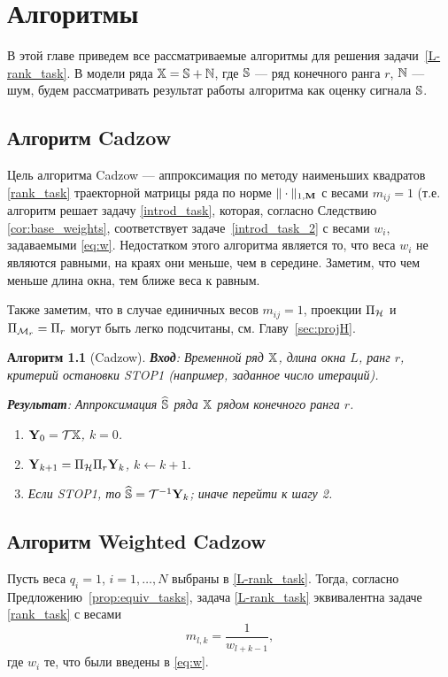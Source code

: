 \documentclass[12pt, specialist, subf,href,colorlinks=true,substylefile = spbu.rtx]{disser}
\newtheorem{algorithm}{Алгоритм}
\theoremstyle{remark}
\theoremstyle{definition}
\begin{document}
\chapter{Алгоритмы}
\label{sec:alg}
В этой главе приведем все рассматриваемые алгоритмы для решения задачи~\eqref{L-rank_task}.
В модели ряда $\mathbb{X}=\mathbb{S}+\mathbb{N}$, где $\mathbb{S}$ --- ряд конечного ранга $r$, $\mathbb{N}$ --- шум, будем рассматривать
результат работы алгоритма как оценку сигнала $\mathbb{S}$.

\section{Алгоритм Cadzow}
Цель алгоритма Cadzow \cite{Cadzow1988} --- аппроксимация по методу наименьших квадратов \eqref{rank_task} траекторной матрицы ряда по норме $\|\cdot\|_{1, \mathbf{M}}$ с весами $m_{ij}=1$ (т.е. алгоритм решает задачу \eqref{introd_task}, которая, согласно Следствию \ref{cor:base_weights}, соответствует задаче~\eqref{introd_task_2} с весами $w_i$, задаваемыми \eqref{eq:w}. Недостатком этого алгоритма является то, что веса $w_i$ не являются равными,
на краях они меньше, чем в середине. Заметим, что чем меньше длина окна, тем ближе веса к равным.

Также заметим, что в случае единичных весов $m_{ij}=1$, проекции $\Pi_{\mathcal{H}}$ и $\Pi_{\mathcal{M}_r}=\Pi_{r}$ могут быть легко подсчитаны, см. Главу~\ref{sec:projH}.

\begin{algorithm}[Cadzow]
\textbf{Вход}: Временной ряд $\mathbb{X}$, длина окна $L$, ранг $r$,
критерий остановки STOP1 (например, заданное число итераций).

\textbf{Результат}:
Аппроксимация $\widehat{\mathbb{S}}$ ряда $\mathbb{X}$ рядом конечного ранга $r$.

\begin{enumerate}
\item
$\mathbf{Y}_0 = \mathcal{T} \mathbb{X}$, $k=0$.
\item
$\mathbf{Y}_{k+1} = \Pi_{\mathcal{H}}  \Pi_{r} \mathbf{Y}_{k}$, $k\leftarrow k+1$.
\item
Если STOP1, то $\widehat{\mathbb{S}} = \mathcal{T}^{-1} \mathbf{Y}_k$; иначе перейти к шагу 2.
\end{enumerate}
\end{algorithm}


\section{Алгоритм Weighted Cadzow}
Пусть веса $q_{i}=1$, $i = 1, \ldots, N$ выбраны в \eqref{L-rank_task}. Тогда, согласно Предложению~\ref{prop:equiv_tasks}, задача \eqref{L-rank_task} эквивалентна задаче \eqref{rank_task} с весами
\begin{equation}
\label{Mw}
   m_{l, k} = \frac{1}{w_{l + k - 1}},
\end{equation}
где $w_i$ те, что были введены в  \eqref{eq:w}.
\end{document}
